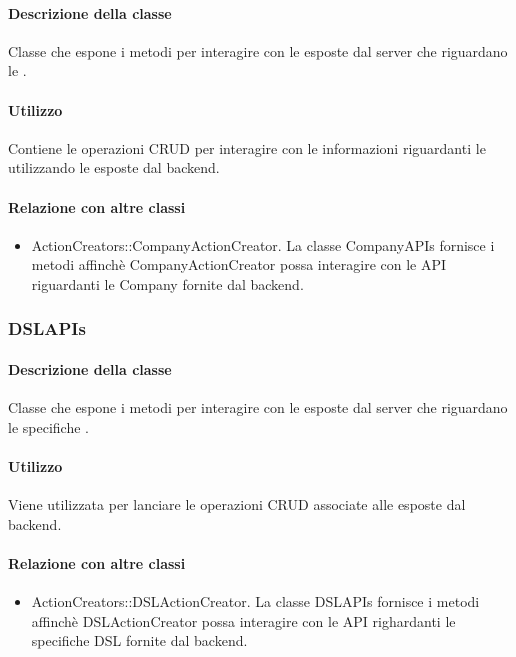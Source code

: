 \paragraph*{Descrizione della classe}
Classe che espone i metodi per interagire con le  esposte dal server che riguardano le .

\paragraph*{Utilizzo}
Contiene le operazioni CRUD per interagire con le informazioni riguardanti le  utilizzando le  esposte dal backend.

\paragraph*{Relazione con altre classi}
\begin{itemize}
\item ActionCreators::CompanyActionCreator. La classe CompanyAPIs fornisce i metodi affinchè CompanyActionCreator possa interagire con le API riguardanti le Company fornite dal backend.
\end{itemize}

\subsubsection{DSLAPIs}
\paragraph*{Descrizione della classe}
Classe che espone i metodi per interagire con le  esposte dal server che riguardano le specifiche .

\paragraph*{Utilizzo}
Viene utilizzata per lanciare le operazioni CRUD associate alle  esposte dal backend.

\paragraph*{Relazione con altre classi}
\begin{itemize}
\item ActionCreators::DSLActionCreator. La classe DSLAPIs fornisce i metodi affinchè DSLActionCreator possa interagire con le API righardanti le specifiche DSL fornite dal backend.
\end{itemize}

